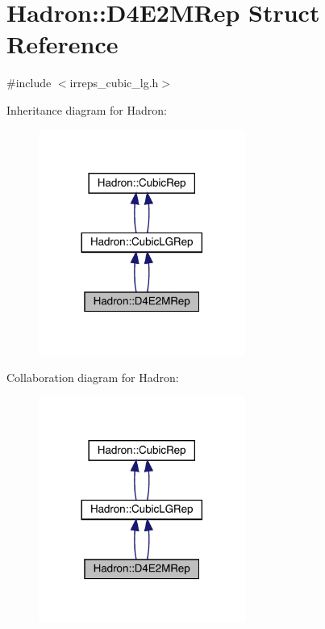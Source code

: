 \hypertarget{structHadron_1_1D4E2MRep}{}\section{Hadron\+:\+:D4\+E2\+M\+Rep Struct Reference}
\label{structHadron_1_1D4E2MRep}


{\ttfamily \#include $<$irreps\+\_\+cubic\+\_\+lg.\+h$>$}



Inheritance diagram for Hadron\+:\nopagebreak
\begin{figure}[H]
\begin{center}
\leavevmode
\includegraphics[width=192pt]{de/dc6/structHadron_1_1D4E2MRep__inherit__graph}
\end{center}
\end{figure}


Collaboration diagram for Hadron\+:\nopagebreak
\begin{figure}[H]
\begin{center}
\leavevmode
\includegraphics[width=192pt]{d8/d7c/structHadron_1_1D4E2MRep__coll__graph}
\end{center}
\end{figure}
